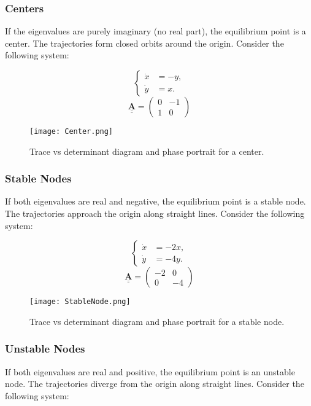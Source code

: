 \documentclass{amsbook}
\begin{document}
\subsubsection{\textbf{Centers}}
If the eigenvalues are purely imaginary (no real part), the equilibrium point is a center. The trajectories form closed orbits around the origin. Consider the following system:

$$
\begin{cases}
\dot{x} &= - y, \\
\dot{y} &= x .
\end{cases}
$$
$$
\underline{\underline{\mathbf{A}}} = \begin{pmatrix} 0 & -1 \\ 1 & 0 \end{pmatrix}
$$

\begin{figure}[H]
    \centering
    \texttt{[image: Center.png]}
    \caption{Trace vs determinant diagram and phase portrait for a center.}
    \label{fig:Center}
\end{figure}

\subsubsection{\textbf{Stable Nodes}}
If both eigenvalues are real and negative, the equilibrium point is a stable node. The trajectories approach the origin along straight lines. Consider the following system:

$$
\begin{cases}
\dot{x} &= -2x, \\
\dot{y} &= -4y.
\end{cases}
$$
$$
\underline{\underline{\mathbf{A}}} = \begin{pmatrix} -2 & 0 \\ 0 & -4 \end{pmatrix}
$$

\begin{figure}[H]
    \centering
    \texttt{[image: StableNode.png]}
    \caption{Trace vs determinant diagram and phase portrait for a stable node.}
    \label{fig:StableNode}
\end{figure}

\subsubsection{\textbf{Unstable Nodes}}
If both eigenvalues are real and positive, the equilibrium point is an unstable node. The trajectories diverge from the origin along straight lines. Consider the following system:
\end{document}
